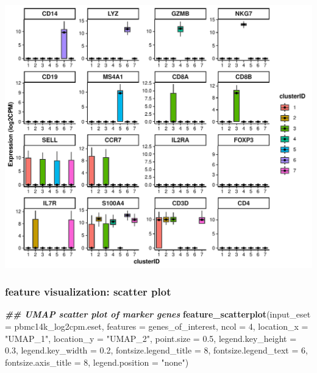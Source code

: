 \documentclass[
  12pt,
]{book}
\newenvironment{Shaded}{\begin{snugshade}}{\end{snugshade}}
\newcommand{\AttributeTok}[1]{\textcolor[rgb]{0.13,0.29,0.53}{#1}}
\newcommand{\DecValTok}[1]{\textcolor[rgb]{0.00,0.00,0.81}{#1}}
\newcommand{\DocumentationTok}[1]{\textcolor[rgb]{0.56,0.35,0.01}{\textbf{\textit{#1}}}}
\newcommand{\FloatTok}[1]{\textcolor[rgb]{0.00,0.00,0.81}{#1}}
\newcommand{\FunctionTok}[1]{\textcolor[rgb]{0.13,0.29,0.53}{\textbf{#1}}}
\newcommand{\NormalTok}[1]{#1}
\newcommand{\StringTok}[1]{\textcolor[rgb]{0.31,0.60,0.02}{#1}}
\begin{document}
\begin{center}\includegraphics{_main_files/figure-latex/featurePlot-box-1} \end{center}

\subsubsection{feature visualization: scatter plot}\label{feature-visualization-scatter-plot}

\begin{Shaded}
\begin{Highlighting}[]
\DocumentationTok{\#\# UMAP scatter plot of marker genes}
\FunctionTok{feature\_scatterplot}\NormalTok{(}\AttributeTok{input\_eset =}\NormalTok{ pbmc14k\_log2cpm.eset, }\AttributeTok{features =}\NormalTok{ genes\_of\_interest, }\AttributeTok{ncol =} \DecValTok{4}\NormalTok{, }\AttributeTok{location\_x =} \StringTok{"UMAP\_1"}\NormalTok{, }\AttributeTok{location\_y =}  \StringTok{"UMAP\_2"}\NormalTok{, }\AttributeTok{point.size =} \FloatTok{0.5}\NormalTok{, }\AttributeTok{legend.key\_height =} \FloatTok{0.3}\NormalTok{, }\AttributeTok{legend.key\_width =} \FloatTok{0.2}\NormalTok{, }\AttributeTok{fontsize.legend\_title =} \DecValTok{8}\NormalTok{, }\AttributeTok{fontsize.legend\_text =} \DecValTok{6}\NormalTok{, }\AttributeTok{fontsize.axis\_title =} \DecValTok{8}\NormalTok{, }\AttributeTok{legend.position =} \StringTok{"none"}\NormalTok{)}
\end{Highlighting}
\end{Shaded}
\end{document}
